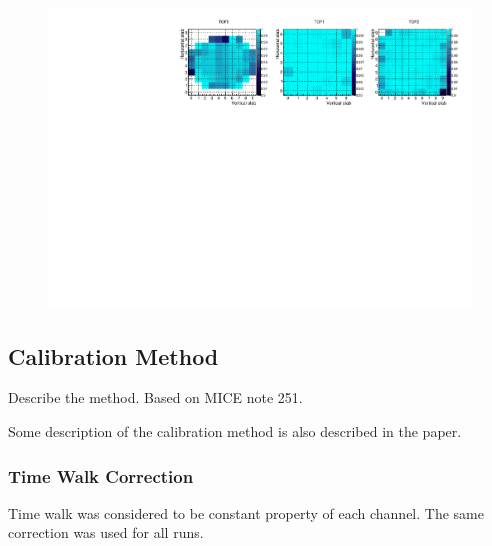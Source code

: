 \begin{figure}
  \begin{center}
  \includegraphics[width=15cm]{08_sp_eff_by_pixel_2d} \\
  \caption{}
  \label{fig:SpEffByPixel}
  \end{center}
\end{figure}




\subsection{Calibration Method}

Describe the method. Based on MICE note 251.


Some description of the calibration method is also described in the paper.




\subsubsection{Time Walk Correction}


Time walk was considered to be constant property of each channel. The
same correction was used for all runs.


